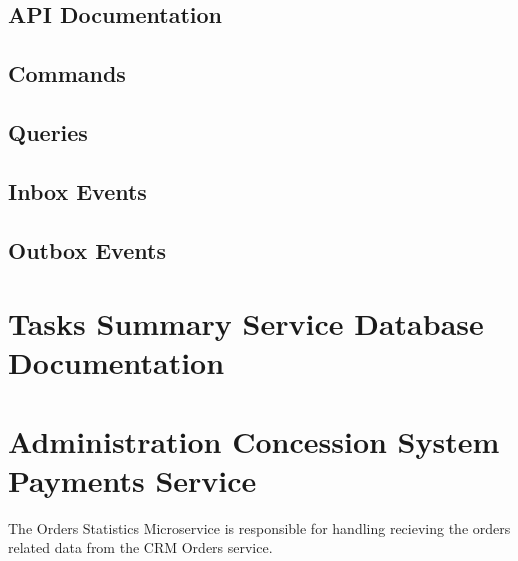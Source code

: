 \documentclass[letterpaper,10pt,english]{sphinxmanual}
\begin{document}


\subsection{API Documentation}
\label{\detokenize{administration_concession_system/tasks_summary_service:api-documentation}}

\subsection{Commands}
\label{\detokenize{administration_concession_system/tasks_summary_service:commands}}

\subsection{Queries}
\label{\detokenize{administration_concession_system/tasks_summary_service:queries}}

\subsection{Inbox Events}
\label{\detokenize{administration_concession_system/tasks_summary_service:inbox-events}}

\subsection{Outbox Events}
\label{\detokenize{administration_concession_system/tasks_summary_service:outbox-events}}

\section{Tasks Summary Service Database Documentation}
\label{\detokenize{administration_concession_system/tasks_summary_service:tasks-summary-service-database-documentation}}
\sphinxstepscope


\section{Administration Concession System Payments Service}
\label{\detokenize{administration_concession_system/orders_service:administration-concession-system-payments-service}}\label{\detokenize{administration_concession_system/orders_service::doc}}
\sphinxAtStartPar
The Orders Statistics Microservice is responsible for handling recieving the orders related data from the CRM Orders service.
\end{document}
